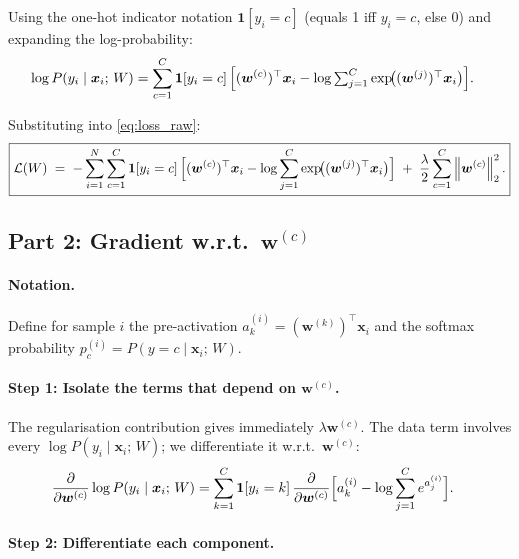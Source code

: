 \documentclass[12pt,a4paper]{article}
\newcommand{\bx}{\bm{x}}
\newcommand{\bw}{\bm{w}}
\newcommand{\ind}[1]{\boldsymbol{1}\!\left[#1\right]}
\newcommand{\norm}[1]{\left\lVert #1 \right\rVert}
\begin{document}
Using the one-hot indicator notation $\ind{y_i = c}$ (equals 1 iff $y_i = c$,
else 0) and expanding the log-probability:
\begin{align}
  \log P(y_i \mid \bx_i;\, W)
  &= \sum_{c=1}^{C} \ind{y_i = c}
     \Bigl[(\bw^{(c)})^\top \bx_i
           - \log\textstyle\sum_{j=1}^{C}\exp\!\bigl((\bw^{(j)})^\top \bx_i\bigr)
     \Bigr].
\end{align}

Substituting into \eqref{eq:loss_raw}:
\begin{equation}
  \boxed{
  \mathcal{L}(W)
  \;=\;
  -\sum_{i=1}^{N}\sum_{c=1}^{C}
     \ind{y_i = c}
     \Bigl[(\bw^{(c)})^\top \bx_i
           - \log\sum_{j=1}^{C}\exp\!\bigl((\bw^{(j)})^\top \bx_i\bigr)
     \Bigr]
  \;+\;
  \frac{\lambda}{2}\sum_{c=1}^{C}\norm{\bw^{(c)}}_{2}^{2}.
  }
  \label{eq:loss_full}
\end{equation}

\subsection{Part 2: Gradient w.r.t.\ \texorpdfstring{$\bw^{(c)}$}{w(c)}}

\paragraph{Notation.}
Define for sample $i$ the pre-activation $a_k^{(i)} = (\bw^{(k)})^\top \bx_i$
and the softmax probability
$p_c^{(i)} = P(y = c \mid \bx_i;\, W)$.

\paragraph{Step 1: Isolate the terms that depend on $\bw^{(c)}$.}

The regularisation contribution gives immediately $\lambda \bw^{(c)}$.
The data term involves every $\log P(y_i \mid \bx_i;\, W)$; we differentiate it
w.r.t.\ $\bw^{(c)}$:
\begin{align}
  \frac{\partial}{\partial \bw^{(c)}}
  \log P(y_i \mid \bx_i;\, W)
  &= \sum_{k=1}^{C} \ind{y_i = k}
     \frac{\partial}{\partial \bw^{(c)}}
     \Bigl[a_k^{(i)} - \log\sum_{j=1}^{C}e^{a_j^{(i)}}\Bigr].
  \label{eq:grad_start}
\end{align}

\paragraph{Step 2: Differentiate each component.}
\end{document}
